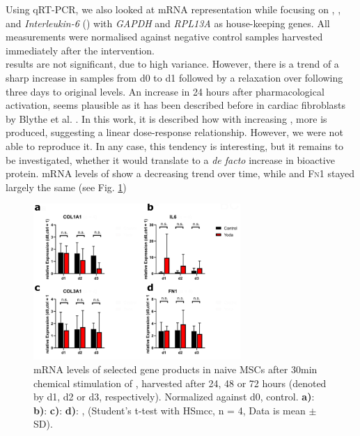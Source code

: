 Using qRT-PCR, we also looked at mRNA representation while focusing on \coloneGene{}, \colthreeGene{}, \FnGene{} and \textit{Interleukin-6} (\ILGene{}) with \textit{GAPDH} and \textit{RPL13A} as house-keeping genes. All measurements were normalised against negative control samples harvested immediately after the intervention. \\
\ILGene{} results are not significant, due to high variance. However, there is a trend of a sharp increase in \Yoda{} samples from d0 to d1 followed by a relaxation over following three days to original levels. An increase in \ILGene{} 24 hours after pharmacological \Piezo{} activation, seems plausible as it has been described before in cardiac fibroblasts by Blythe et al. \cite{Blythe2019}. In this work, it is described how with increasing \Yoda{}, more \ILGene{} is produced, suggesting a linear dose-response relationship. However, we were not able to reproduce it. In any case, this tendency is interesting, but it remains to be investigated, whether it would translate to a \textit{de facto} increase in bioactive \IL protein. mRNA levels of \colone{} show a decreasing trend over time, while \colthree and \textsc{Fn}1 stayed largely the same (see Fig. \ref{fig:Yoda_Norm_PCR})\par



\begin{figure}[ht]
	\centering
	\includegraphics[width = 0.7\textwidth]{NormalYodaExp_PCR.png}
	\caption{mRNA levels of selected gene products in naive MSCs after 30min chemical stimulation of \Piezo{}, harvested after 24, 48 or 72 hours (denoted by d1, d2 or d3, respectively). Normalized against d0, control.
	    \textbf{a)}: \coloneGene{}
		\textbf{b)}: \ILGene{}
		\textbf{c)}: \colthreeGene{}
		\textbf{d)}: \FnGene, 
		(Student's t-test with HSmcc, n = 4, Data is mean $\pm$ SD). 
	}
	\label{fig:Yoda_Norm_PCR}
\end{figure}


